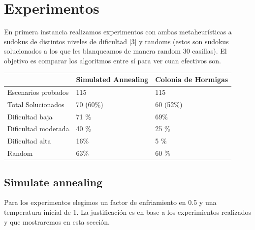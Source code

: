 \section{Experimentos}

En primera instancia realizamos experimentos con ambas metaheurísticas a sudokus de distintos niveles de dificultad [3] y randoms (estos son sudokus solucionados a los que les blanqueamos de manera random 30 casillas). El objetivo es comparar los algoritmos entre sí para ver cuan efectivos son.


\begin{table}[ht]
\centering
\begin{tabular}{|l|l|l|}
\hline
          & \textbf{Simulated Annealing} & \textbf{Colonia de Hormigas} \\ \hline
{Escenarios probados} &       115                       &        115                      \\ \hline
{Total Solucionados} &                      70 (60\%)      &              60 (52\%)               \\ \hline
{Dificultad baja} &                     71 \%         &              69\%                \\ \hline
{Dificultad moderada} &                  40 \%            &             25 \%                 \\ \hline
{Dificultad alta} &                         16\%     &            5 \%                  \\ \hline
{Random} &                         63\%     &            60 \%                  \\ \hline
\end{tabular}
\end{table}



\subsection{Simulate annealing}
Para los experimentos elegimos un factor de enfriamiento en 0.5 y una temperatura inicial de 1. La justificación es en base a los experimientos realizados y que mostraremos en esta sección. \\ \\


